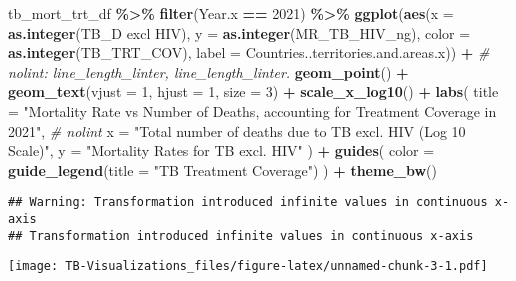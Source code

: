 \documentclass[
]{article}
\newenvironment{Shaded}{\begin{snugshade}}{\end{snugshade}}
\newcommand{\AttributeTok}[1]{\textcolor[rgb]{0.13,0.29,0.53}{#1}}
\newcommand{\CommentTok}[1]{\textcolor[rgb]{0.56,0.35,0.01}{\textit{#1}}}
\newcommand{\DecValTok}[1]{\textcolor[rgb]{0.00,0.00,0.81}{#1}}
\newcommand{\FunctionTok}[1]{\textcolor[rgb]{0.13,0.29,0.53}{\textbf{#1}}}
\newcommand{\NormalTok}[1]{#1}
\newcommand{\SpecialCharTok}[1]{\textcolor[rgb]{0.81,0.36,0.00}{\textbf{#1}}}
\newcommand{\StringTok}[1]{\textcolor[rgb]{0.31,0.60,0.02}{#1}}
\begin{document}
\begin{Shaded}
\begin{Highlighting}[]
\NormalTok{tb\_mort\_trt\_df }\SpecialCharTok{\%\textgreater{}\%}
  \FunctionTok{filter}\NormalTok{(Year.x }\SpecialCharTok{==} \DecValTok{2021}\NormalTok{) }\SpecialCharTok{\%\textgreater{}\%}
  \FunctionTok{ggplot}\NormalTok{(}\FunctionTok{aes}\NormalTok{(}\AttributeTok{x =} \FunctionTok{as.integer}\NormalTok{(}\StringTok{\textasciigrave{}}\AttributeTok{TB\_D excl HIV}\StringTok{\textasciigrave{}}\NormalTok{), }\AttributeTok{y =} \FunctionTok{as.integer}\NormalTok{(MR\_TB\_HIV\_ng), }\AttributeTok{color =} \FunctionTok{as.integer}\NormalTok{(TB\_TRT\_COV), }\AttributeTok{label =}\NormalTok{ Countries..territories.and.areas.x)) }\SpecialCharTok{+} \CommentTok{\# nolint: line\_length\_linter, line\_length\_linter.}
  \FunctionTok{geom\_point}\NormalTok{() }\SpecialCharTok{+}
  \FunctionTok{geom\_text}\NormalTok{(}\AttributeTok{vjust =} \DecValTok{1}\NormalTok{, }\AttributeTok{hjust =} \DecValTok{1}\NormalTok{, }\AttributeTok{size =} \DecValTok{3}\NormalTok{) }\SpecialCharTok{+}
  \FunctionTok{scale\_x\_log10}\NormalTok{() }\SpecialCharTok{+}
  \FunctionTok{labs}\NormalTok{(}
    \AttributeTok{title =} \StringTok{"Mortality Rate vs Number of Deaths, accounting for Treatment Coverage in 2021"}\NormalTok{, }\CommentTok{\# nolint}
    \AttributeTok{x =} \StringTok{"Total number of deaths due to TB excl. HIV (Log 10 Scale)"}\NormalTok{,}
    \AttributeTok{y =} \StringTok{"Mortality Rates for TB excl. HIV"}
\NormalTok{  ) }\SpecialCharTok{+}
  \FunctionTok{guides}\NormalTok{(}
    \AttributeTok{color =} \FunctionTok{guide\_legend}\NormalTok{(}\AttributeTok{title =} \StringTok{"TB Treatment Coverage"}\NormalTok{)}
\NormalTok{  ) }\SpecialCharTok{+}
  \FunctionTok{theme\_bw}\NormalTok{()}
\end{Highlighting}
\end{Shaded}

\begin{verbatim}
## Warning: Transformation introduced infinite values in continuous x-axis
## Transformation introduced infinite values in continuous x-axis
\end{verbatim}

\texttt{[image: TB-Visualizations\_files/figure-latex/unnamed-chunk-3-1.pdf]}
\end{document}
